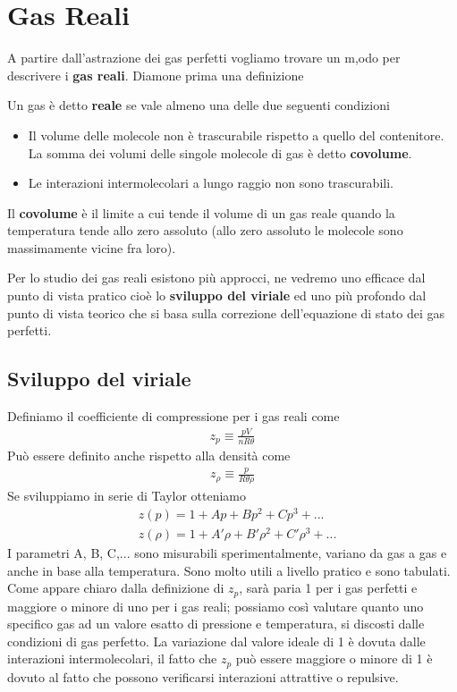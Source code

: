 \documentclass[
10pt, %
a4paper, %
oneside, %
headinclude,footinclude, %
BCOR5mm, %
]{scrartcl}
\begin{document}
\section{Gas Reali}
A partire dall'astrazione dei gas perfetti vogliamo trovare un m,odo per descrivere i \textbf{gas reali}. Diamone prima una definizione
\begin{definition}
	Un gas è detto \textbf{reale} se vale almeno una delle due seguenti condizioni
	\begin{itemize}
		\item Il volume delle molecole non è trascurabile rispetto a quello del contenitore. La somma dei volumi delle singole molecole di gas è detto \textbf{covolume}.
		\item Le interazioni intermolecolari a lungo raggio non sono trascurabili. 
	\end{itemize}
\end{definition}
\begin{definition}
	Il \textbf{covolume} è il limite a cui tende il volume di un gas reale quando la temperatura tende allo zero assoluto (allo zero assoluto le molecole sono massimamente vicine fra loro).
\end{definition}
Per lo studio dei gas reali esistono più approcci, ne vedremo uno efficace dal punto di vista pratico cioè lo \textbf{sviluppo del viriale} ed uno più profondo dal punto di vista teorico che si basa sulla correzione dell'equazione di stato dei gas perfetti. 
\subsection{Sviluppo del viriale}
Definiamo il coefficiente di compressione per i gas reali come
\begin{align*} 
	z_p \equiv \frac{p V}{n R \theta}
\end{align*} 
Può essere definito anche rispetto alla densità come
\begin{align*} 
	z_{\rho} \equiv \frac{p}{R \theta \rho}
\end{align*} 
Se sviluppiamo in serie di Taylor otteniamo
\begin{align*} 
	&z(p) = 1 + Ap + Bp^2+Cp^3+...\\
	&z(\rho)= 1 + A'\rho + B'\rho^2+C'\rho^3+...
\end{align*} 
I parametri A, B, C,... sono misurabili sperimentalmente, variano da gas a gas e anche in base alla temperatura. Sono molto utili a livello pratico e sono tabulati. Come appare chiaro dalla definizione di $z_p$, sarà paria 1 per i gas perfetti e maggiore o minore di uno per i gas reali; possiamo così valutare quanto uno specifico gas ad un valore esatto di pressione e temperatura, si discosti dalle condizioni di gas perfetto. La variazione dal valore ideale di 1 è dovuta dalle interazioni intermolecolari, il fatto che $z_p$ può essere maggiore o minore di 1 è dovuto al fatto che possono verificarsi interazioni attrattive o repulsive. 
\end{document}
